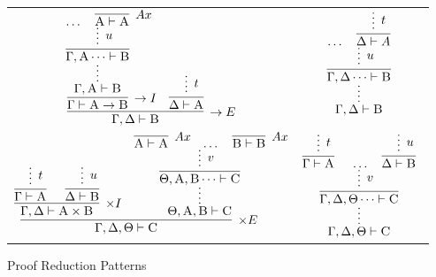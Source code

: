 \begin{figure}
	\begin{tabularx}{0.9\textwidth}{@{}c@{~$\implies$~}c@{}}
	$\infer[\to E]{\Gamma, \Delta \vdash \prop{B}}{
	\infer[\to I]{\Gamma \vdash \prop{A} \to \prop{B}}{
		\infer*[]{\Gamma, \prop{A} \vdash \prop{B}}{
			\infer[]{\Gamma, \prop{A} \dots \vdash \prop{B}}{
				\infer*[u]{}{\dots & \infer[Ax]{\prop{A} \vdash \prop{A}}{} 
				}
			}
		}
	}
	&
	\infer{\Delta \vdash \prop{A}}{
	\infer*[t]{}{}
	}
	}$
	&
	$ 
	\infer*[]{\Gamma, \Delta \vdash \prop{B}}{
		\infer[]{\Gamma, \Delta \dots \vdash \prop{B}}{
			\infer*[u]{}{
			\dots &
			\infer[]{\Delta \vdash A}{
				\infer*[t]{}{}
			}}
		}
	}
	$\\[2em]
	$
	\infer[\times E]{\Gamma, \Delta, \Theta \vdash \prop{C}}{
		\infer[\times I]{\Gamma, \Delta \vdash \prop{A} \times \prop{B}}{
			\infer[]{\Gamma \vdash \prop{A}}{\infer*[t]{}{}}
			&
			\infer[]{\Delta \vdash \prop{B}}{\infer*[u]{}{}}
		}		
		&
		\infer*[]{\Theta, \prop{A}, \prop{B} \vdash \prop{C}}{
			\infer[]{\Theta, \prop{A}, \prop{B}\dots \vdash \prop{C}}{
				\infer*[v]{}{
					\infer[Ax]{\prop{A} \vdash \prop{A}}{
					}
					&
					\dots
					&
					\infer[Ax]{\prop{B} \vdash \prop{B}}{}
				}
			}
		}
	}
	$
	&
	$
	\infer*[]{\Gamma, \Delta, \Theta \vdash \prop{C}}{
		\infer[]{\Gamma, \Delta, \Theta \dots \vdash \prop{C}}{
			\infer*[v]{}{
				\infer[]{\Gamma \vdash \prop{A}}{
					\infer*[t]{}{}
				}
				&
				\dots 
				&
				\infer[]{\Delta \vdash \prop{B}}{
					\infer*[u]{}{}
				}
			}
		}
	} 
	$
	\end{tabularx}
	\caption{Proof Reduction Patterns}
	\label{figure:intuitionistic_proof_reduction}
\end{figure}


